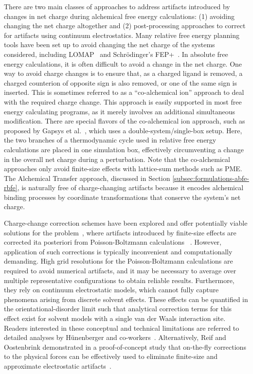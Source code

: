 \documentclass[9pt,bestpractices]{livecoms}
\begin{document}
There are two main classes of approaches to address artifacts introduced by changes in net charge during alchemical free energy calculations: (1) avoiding changing the net charge altogether and (2) post-processing approaches to correct for artifacts using continuum electrostatics.
Many relative free energy planning tools have been set up to avoid changing the net charge of the systems considered, including LOMAP~\cite{liu2013lead} and Schr\"{o}dinger's FEP+~\cite{wang2015accurate}. In absolute free energy calculations, it is often difficult to avoid a change in the net charge. One way to avoid charge changes is to ensure that, as a charged ligand is removed, a charged counterion of opposite sign is also removed, or one of the same sign is inserted. This is sometimes referred to as a “co-alchemical ion” approach to deal with the required charge change. This approach is easily supported in most free energy calculating programs, as it merely involves an additional simultaneous modification.
There are special flavors of the co-alchemical ion approach, such as proposed by Gapsys et al.~\cite{gapsys2015calculation}, which uses a double-system/single-box setup. Here, the two branches of a thermodynamic cycle used in relative free energy calculations are placed in one simulation box, effectively circumventing a change in the overall net charge during a perturbation. 
Note that the co-alchemical approaches only avoid finite-size effects with lattice-sum methods such as PME.
The Alchemical Transfer approach,\cite{wu2021alchemical,azimi2022relative} discussed in Section \ref{subsec:formulations-abfe-rbfe}, is naturally free of charge-changing artifacts because it encodes alchemical binding processes by coordinate transformations that conserve the system's net charge.

Charge-change correction schemes have been explored and offer potentially viable solutions for the problem~\cite{mey2018impact}, where artifacts introduced by finite-size effects are corrected \text it{a posteriori} from Poisson-Boltzmann calculations ~\cite{chen2018accurate, ohlknecht2020correcting, rocklin2013calculating,Reif2014chargecorrection}. However, application of such corrections is typically inconvenient and computationally demanding. High grid resolutions for the Poisson-Boltzmann calculations are required to avoid numerical artifacts, and it may be necessary to average over multiple representative configurations to obtain reliable results. Furthermore, they rely on continuum electrostatic models, which cannot fully capture phenomena arising from discrete solvent effects. These effects can be quantified in the orientational-disorder limit such that analytical correction terms for this effect exist for solvent models with a single van der Waals interaction site. Readers interested in these conceptual and technical limitations are referred to detailed analyses by H\"{u}nenberger and co-workers~\cite{kastenholz2006solvfe, rocklin2013calculating}.
Alternatively, Reif and Oostenbrink demonstrated in a proof-of-concept study that on-the-fly corrections to the physical forces can be effectively used to eliminate finite-size and approximate electrostatic artifacts~\cite{Reif2015onthefly}.
\end{document}
